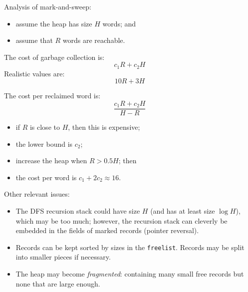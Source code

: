 \begin{slide*}
Analysis of mark-and-sweep:

\begin{itemize}
\item assume the heap has size $H$ words; and
\item assume that $R$ words are reachable.
\end{itemize}

The cost of garbage collection is:
$$c_1R + c_2H$$
Realistic values are:
$$10R + 3H$$

The cost per reclaimed word is:
$$ \frac{c_1R + c_2H}{H-R}$$

\begin{itemize}
\item if $R$ is close to $H$, then this is expensive;
\item the lower bound is $c_2$;
\item increase the heap when $R > 0.5H$; then
\item the cost per word is $c_1 + 2c_2 \approx 16$.
\end{itemize}
\vfil
\end{slide*}
 
\begin{slide*}
Other relevant issues:\\

\begin{itemize}
\item The DFS recursion stack could have size $H$ (and has at least size $\log H$), which
may be too much; however, the recursion stack can cleverly
be embedded in the fields of marked records (pointer reversal).

\item Records can be kept sorted by sizes in the {\tt freelist}. Records may be split into 
smaller pieces if necessary.

\item The heap may become {\em fragmented}: 
containing many small free records but none that are large
enough.
\end{itemize}
\vfil
\end{slide*}
 
